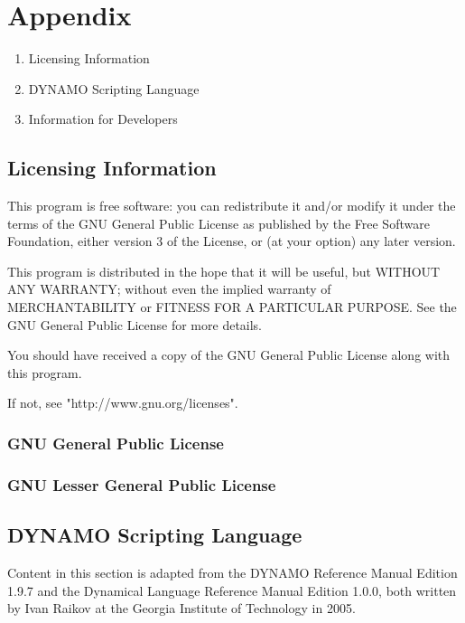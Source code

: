 \clearpage

\chapter*{Appendix}

\appendix

\begin{enumerate}
\item Licensing Information
\item DYNAMO Scripting Language
\item Information for Developers
\end{enumerate}

\section{Licensing Information}
This program is free software: you can redistribute it and/or modify it under the terms of the GNU General Public License as published by the Free Software Foundation, either version 3 of the License, or (at your option) any later version.

This program is distributed in the hope that it will be useful, but WITHOUT ANY WARRANTY; without even the implied warranty of MERCHANTABILITY or FITNESS FOR A PARTICULAR PURPOSE.  See the GNU General Public License for more details.

You should have received a copy of the GNU General Public License along with this program.  

If not, see "http://www.gnu.org/licenses".
\bigskip


\subsection{GNU General Public License}



\subsection{GNU Lesser General Public License}



\section{DYNAMO Scripting Language}
\label{dynamo appendix}
Content in this section is adapted from the DYNAMO Reference Manual Edition 1.9.7 and the Dynamical Language Reference Manual Edition 1.0.0, both written by Ivan Raikov at the Georgia Institute of Technology in 2005.

